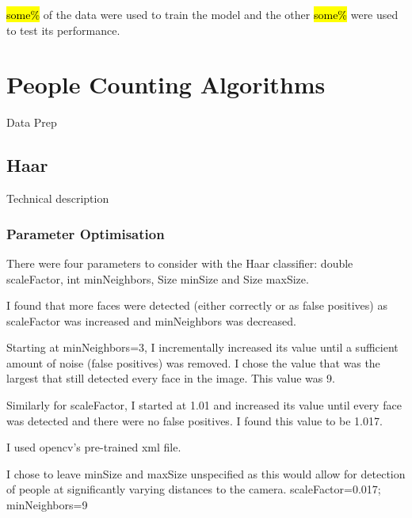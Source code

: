 \documentclass{article}
\begin{document}
\hl{some\%} of the data were used to train the model and the other \hl{some\%} were used to test its performance.

\section{People Counting Algorithms}
Data Prep

\subsection{Haar}
Technical description
\subsubsection{Parameter Optimisation}
There were four parameters to consider with the Haar classifier: double scaleFactor, int minNeighbors, Size minSize and Size maxSize.

I found that more faces were detected (either correctly or as false positives) as scaleFactor was increased and minNeighbors was decreased.

Starting at minNeighbors=3, I incrementally increased its value until a sufficient amount of noise (false positives) was removed. I chose the value that was the largest that still detected every face in the image. This value was 9.

Similarly for scaleFactor, I started at 1.01 and increased its value until every face was detected and there were no false positives. I found this value to be 1.017. 

I used opencv's pre-trained xml file.

I chose to leave minSize and maxSize unspecified as this would allow for detection of people at significantly varying distances to the camera.
scaleFactor=0.017; minNeighbors=9

\end{document}
